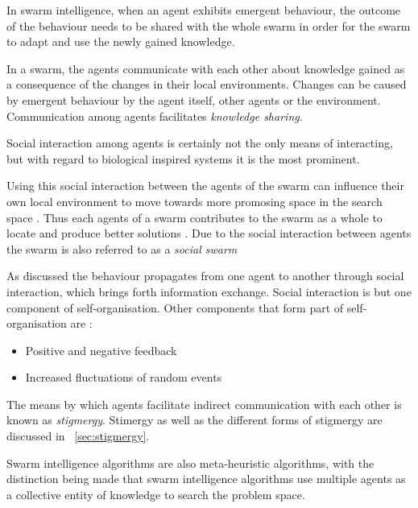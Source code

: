 In swarm intelligence, when an agent exhibits emergent behaviour, the outcome of the behaviour needs to be shared with the whole swarm in order for the swarm to adapt and use the newly gained knowledge\cite{CompuIntelligenceIntro,FundamentalSwarm}.

In a swarm, the agents communicate with each other about knowledge gained as a consequence of the changes in their local environments\cite{SwarmArt,ChaoticSwarmIntel}. Changes can be caused by emergent behaviour by the agent itself, other agents or the environment\cite{CompuIntelligenceIntro,FundamentalSwarm}. Communication among agents facilitates \emph{knowledge sharing}\cite{SwarmArt,FundamentalSwarm}. 

Social interaction among agents is certainly not the only means of interacting, but with regard to biological inspired systems it is the most prominent\cite{CompuIntelligenceIntro}.

Using this social interaction between the agents of the swarm can influence their own local environment to move towards more promosing space in the search space \cite{ChaoticSwarmIntel,CompuIntelligenceIntro}. Thus each agents of a swarm contributes to the swarm as a whole to locate and produce better solutions \cite{BeeJobShop}. Due to the social interaction between agents the swarm is also referred to as a \emph{social swarm}\cite{ChaoticSwarmIntel,FundamentalSwarm} 

As discussed the behaviour propagates from one agent to another through social interaction, which brings forth information exchange\cite{SwarmArt}. Social interaction is but one component of self-organisation. Other components that form part of self-organisation are \cite{SIPowerInNums}:
\begin{itemize}
\item Positive and negative feedback\cite{SIPowerInNums}
\item Increased fluctuations of random events\cite{SIPowerInNums}
\end{itemize}

The means by which agents facilitate indirect communication with each other is known as \emph{stigmergy}. Stimergy as well as the different forms of stigmergy are discussed in ~\ref{sec:stigmergy}.

Swarm intelligence algorithms are also meta-heuristic algorithms, with the distinction being made that swarm intelligence algorithms use multiple agents as a collective entity of knowledge to search the problem space\cite{SwarmArt,ChaoticSwarmIntel,BeeJobShop,CompuIntelligenceIntro,FundamentalSwarm}.

